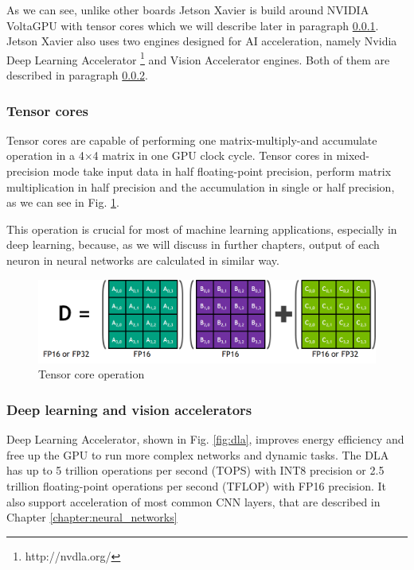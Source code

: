 \documentclass[twoside]{ctuthesis}
\theoremstyle{plain}
\theoremstyle{definition}
\theoremstyle{note}
\begin{document}
As we can see, unlike other boards Jetson Xavier is build around NVIDIA Volta\texttrademark GPU with tensor cores which we will describe later in paragraph \ref{subsection:tensor_cores}. Jetson Xavier also uses two engines designed for AI acceleration, namely Nvidia Deep Learning Accelerator \footnote{http://nvdla.org/} and Vision Accelerator engines. Both of them are described in paragraph \ref{sssection:accelerators}. 
\subsubsection{Tensor cores}
\label{subsection:tensor_cores}
Tensor cores are capable of performing one matrix-multiply-and accumulate operation in a 4$\times$4 matrix in one GPU clock cycle.%
Tensor cores in mixed-precision mode take input data in half floating-point precision, perform matrix multiplication in half precision and the accumulation in single or half precision, as we can see in Fig. \ref{tensor_core}.

 This operation is crucial for most of machine learning applications, especially in deep learning, because, as we will discuss in further chapters, output of each neuron in neural networks are calculated in similar way. 
\begin{figure}[h]
\caption{Tensor core operation %
}
\label{tensor_core}
\includegraphics[width=\textwidth]{images/introduction/tensor_core.png}
\end{figure}


\subsubsection{Deep learning and vision accelerators}
\label{sssection:accelerators}

Deep Learning Accelerator, shown in Fig. \ref{fig:dla}, improves energy efficiency and free up the GPU to run more complex networks and dynamic tasks. The DLA has up to 5 trillion operations per second (TOPS) with INT8 precision or 2.5 trillion floating-point operations per second (TFLOP) with FP16 precision.%
It also support acceleration of most common CNN layers, that are described in Chapter \ref{chapter:neural_networks}
\end{document}
